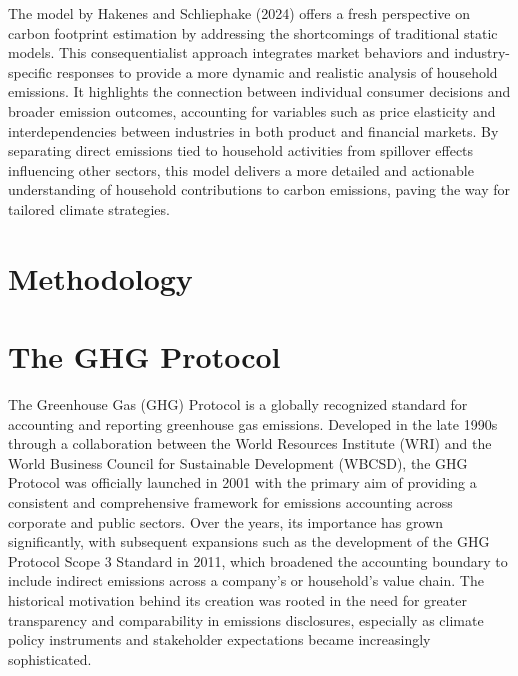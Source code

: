 \documentclass[12pt,a4paper]{article}%
\begin{document}
The model by Hakenes and Schliephake (2024) offers a fresh perspective on carbon footprint estimation by addressing the shortcomings of traditional static models. This consequentialist approach integrates market behaviors and industry-specific responses to provide a more dynamic and realistic analysis of household emissions. It highlights the connection between individual consumer decisions and broader emission outcomes, accounting for variables such as price elasticity and interdependencies between industries in both product and financial markets. By separating direct emissions tied to household activities from spillover effects influencing other sectors, this model delivers a more detailed and actionable understanding of household contributions to carbon emissions, paving the way for tailored climate strategies.


\section{Methodology}
\lipsum[3-4]

\section{The GHG Protocol}
The Greenhouse Gas (GHG) Protocol is a globally recognized standard for accounting and reporting greenhouse gas emissions. Developed in the late 1990s through a collaboration between the World Resources Institute (WRI) and the World Business Council for Sustainable Development (WBCSD), the GHG Protocol was officially launched in 2001 with the primary aim of providing a consistent and comprehensive framework for emissions accounting across corporate and public sectors. Over the years, its importance has grown significantly, with subsequent expansions such as the development of the GHG Protocol Scope 3 Standard in 2011, which broadened the accounting boundary to include indirect emissions across a company’s or household’s value chain. The historical motivation behind its creation was rooted in the need for greater transparency and comparability in emissions disclosures, especially as climate policy instruments and stakeholder expectations became increasingly sophisticated.
\end{document}
